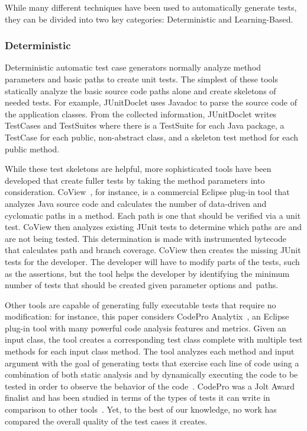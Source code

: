 While many different techniques have been used to automatically generate tests, they can be divided into two key categories: Deterministic and Learning-Based.

\subsubsection{Deterministic}

Deterministic automatic test case generators normally analyze method parameters and basic paths to create unit tests.  The simplest of these tools statically analyze the basic source code paths alone and create skeletons of  needed tests.  For example, JUnitDoclet \cite{JUnitDoclet} uses Javadoc to parse the source code of the application classes. From the collected information, JUnitDoclet writes TestCases and TestSuites where there is a TestSuite for each Java package, a TestCase for each public, non-abstract class, and a skeleton test method for each public method. %


While these test skeletons are helpful, more sophisticated tools have been developed that create fuller tests by taking the method parameters into consideration. CoView~\cite{CoView}, for instance, is a commercial Eclipse plug-in tool that analyzes Java source code and calculates the number of data-driven and cyclomatic paths in a method. Each path is one that should be verified via a unit test. CoView then analyzes existing JUnit tests to determine which paths are and are not being tested. This determination is made with instrumented bytecode that calculates path and branch coverage. CoView then creates the missing JUnit tests for the developer. The developer will have to modify parts of the tests, such as the assertions, but the tool helps the developer by identifying the minimum number of tests that should be created given parameter options \mbox{and paths}.

Other tools are capable of generating fully executable tests that require no modification: for instance, this paper considers CodePro Analytix~\cite{CodePro1}, an Eclipse plug-in tool with many powerful code analysis features and metrics.  Given an input class, the tool creates a corresponding test class complete with multiple test methods for each input class method. The tool analyzes each method and input argument with the goal of generating tests that exercise each line of code using a combination of both static analysis and by dynamically executing the code to be tested in order to observe the behavior of the code~\cite{CodePro2}.  CodePro was a Jolt Award finalist and has been studied in terms of the types of tests it can write in comparison to other tools~\cite{xie2009}.  Yet, to the best of our knowledge, no work has compared the overall quality of the test cases it creates.

